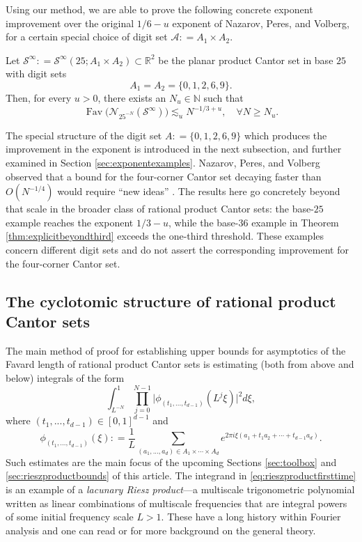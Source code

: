 \documentclass[12pt]{amsart}
\numberwithin{equation}{section}
\DeclareMathOperator{\Fav}{Fav}
\begin{document}
Using our method, we are able to prove the following concrete exponent improvement over the original $1/6 - u$ exponent of Nazarov, Peres, and Volberg, for a certain special choice of digit set $\mathcal{A} : = A_1 \times A_2$.

\begin{theorem}\label{thm:explicitonethird}
Let $\mathcal S^\infty : = \mathcal{S}^{\infty} (25 ; A_1 \times A_2) \subset \mathbb{R}^2$ be the planar product Cantor set in base $25$ with digit sets
$$
A_1=A_2=\{0,1,2,6,9\}.
$$
Then, for every $u > 0$, there exists an $N_u \in \mathbb{N}$ such that
\[
 \Fav\bigl(\mathcal N_{25^{-N}}(\mathcal S^\infty)\bigr)
 \lesssim_u N^{-1/3+u}, \quad \forall N \geq N_u.
\]
\end{theorem}

The special structure of the digit set $A : = \{0,1,2,6,9\}$ which produces the improvement in the exponent is introduced in the next subsection, and further examined in Section \ref{sec:exponentexamples}. Nazarov, Peres, and Volberg observed that a bound for the four-corner Cantor set decaying faster than $O(N^{-1/4})$ would require ``new ideas'' \cite[p. 3]{NPV}.  The results here go concretely beyond that scale in the broader class of rational product Cantor sets: the base-$25$ example reaches the exponent $1/3-u$, while the base-$36$ example in Theorem \ref{thm:explicitbeyondthird} exceeds the one-third threshold.  These examples concern different digit sets and do not assert the corresponding improvement for the four-corner Cantor set.


\subsection{The cyclotomic structure of rational product Cantor sets}\label{subsec:digitsetpoly}

The main method of proof for establishing upper bounds for asymptotics of the Favard length of rational product Cantor sets is estimating (both from above and below) integrals of the form
\begin{equation}\label{eq:rieszproductfirsttime}
\int_{L^{-N}}^1 \prod_{j=0}^{N-1} \vert \phi_{(t_1,...,t_{d-1})} (L^j \xi) \vert^2 d \xi,
\end{equation}
where $(t_1,...,t_{d-1}) \in [0,1]^{d-1}$ and 
$$
\phi_{(t_1,...,t_{d-1})} (\xi) : = \frac{1}{L} \sum\limits_{(a_1,...,a_d) \in A_1 \times \cdots \times A_d} e^{2 \pi i \xi (a_1 + t_1 a_2 + \cdots + t_{d-1} a_d)}.
$$
Such estimates are the main focus of the upcoming Sections \ref{sec:toolbox} and \ref{sec:rieszproductbounds} of this article. The integrand in \eqref{eq:rieszproductfirsttime} is an example of a \textit{lacunary Riesz product}---a multiscale trigonometric polynomial written as linear combinations of multiscale frequencies that are integral powers of some initial frequency scale $L > 1$. These have a long history within Fourier analysis and one can read \cite[Chapter 13]{mattila2} or \cite[Chapter 5]{Zygmund} for more background on the general theory.
\end{document}
